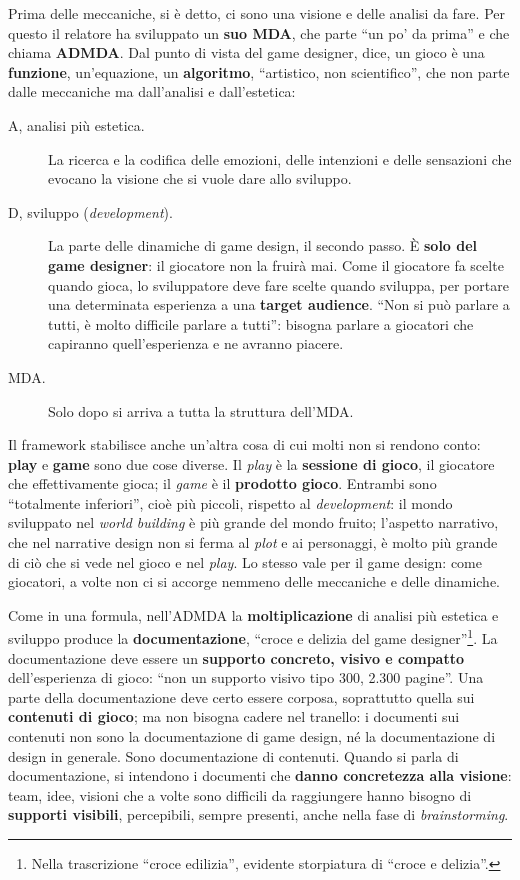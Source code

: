 Prima delle meccaniche, si è detto, ci sono una visione e delle analisi da
fare. Per questo il relatore ha sviluppato un \textbf{suo MDA}, che parte ``un
po' da prima'' e che chiama \textbf{ADMDA}. Dal punto di vista del game
designer, dice, un gioco è una \textbf{funzione}, un'equazione, un
\textbf{algoritmo}, ``artistico, non scientifico'', che non parte dalle
meccaniche ma dall'analisi e dall'estetica:
\begin{description}
  \item[A, analisi più estetica.] La ricerca e la codifica delle emozioni,
        delle intenzioni e delle sensazioni che evocano la visione che si vuole
        dare allo sviluppo.
  \item[D, sviluppo (\emph{development}).] La parte delle dinamiche di game
        design, il secondo passo. È \textbf{solo del game designer}: il
        giocatore non la fruirà mai. Come il giocatore fa scelte quando gioca,
        lo sviluppatore deve fare scelte quando sviluppa, per portare una
        determinata esperienza a una \textbf{target audience}. ``Non si può
        parlare a tutti, è molto difficile parlare a tutti'': bisogna parlare a
        giocatori che capiranno quell'esperienza e ne avranno piacere.
  \item[MDA.] Solo dopo si arriva a tutta la struttura dell'MDA.
\end{description}

Il framework stabilisce anche un'altra cosa di cui molti non si rendono conto:
\textbf{play} e \textbf{game} sono due cose diverse. Il \emph{play} è la
\textbf{sessione di gioco}, il giocatore che effettivamente gioca; il
\emph{game} è il \textbf{prodotto gioco}. Entrambi sono ``totalmente
inferiori'', cioè più piccoli, rispetto al \emph{development}: il mondo
sviluppato nel \emph{world building} è più grande del mondo fruito; l'aspetto
narrativo, che nel narrative design non si ferma al \emph{plot} e ai personaggi,
è molto più grande di ciò che si vede nel gioco e nel \emph{play}. Lo stesso
vale per il game design: come giocatori, a volte non ci si accorge nemmeno delle
meccaniche e delle dinamiche.

Come in una formula, nell'ADMDA la \textbf{moltiplicazione} di analisi più
estetica e sviluppo produce la \textbf{documentazione}, ``croce e delizia del
game designer''\footnote{Nella trascrizione ``croce edilizia'', evidente
storpiatura di ``croce e delizia''.}. La documentazione deve essere un
\textbf{supporto concreto, visivo e compatto} dell'esperienza di gioco: ``non un
supporto visivo tipo 300, 2.300 pagine''. Una parte della documentazione deve
certo essere corposa, soprattutto quella sui \textbf{contenuti di gioco}; ma non
bisogna cadere nel tranello: i documenti sui contenuti non sono la
documentazione di game design, né la documentazione di design in generale. Sono
documentazione di contenuti. Quando si parla di documentazione, si intendono i
documenti che \textbf{danno concretezza alla visione}: team, idee, visioni che a
volte sono difficili da raggiungere hanno bisogno di \textbf{supporti visibili},
percepibili, sempre presenti, anche nella fase di \emph{brainstorming}.

